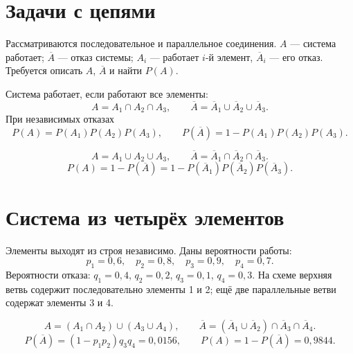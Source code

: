 \section*{Задачи с цепями}
Рассматриваются последовательное и параллельное соединения.
$A$ --- система работает; $\overline A$ --- отказ системы;
$A_i$ --- работает $i$-й элемент, $\overline A_i$ --- его отказ.
Требуется описать $A$, $\overline A$ и найти $P(A)$.

\begin{center}
\end{center}
Система работает, если работают все элементы:
\[
 A=A_1\cap A_2\cap A_3,\qquad
 \overline A=\overline A_1\cup\overline A_2\cup\overline A_3.
\]
При независимых отказах
\[
 P(A)=P(A_1)P(A_2)P(A_3),\qquad
 P(\overline A)=1-P(A_1)P(A_2)P(A_3).
\]
\begin{center}
\end{center}
\[
 A=A_1\cup A_2\cup A_3,\qquad
 \overline A=\overline A_1\cap\overline A_2\cap\overline A_3.
\]
\[
 P(A)=1-P(\overline A)=1-P(\overline A_1)P(\overline A_2)P(\overline A_3).
\]

\section*{Система из четырёх элементов}
Элементы выходят из строя независимо. Даны вероятности работы:
\[
 p_1=0{,}6,\quad p_2=0{,}8,\quad p_3=0{,}9,\quad p_4=0{,}7.
\]
Вероятности отказа: $q_1=0{,}4$, $q_2=0{,}2$, $q_3=0{,}1$, $q_4=0{,}3$.
На схеме верхняя ветвь содержит последовательно элементы 1 и 2;
ещё две параллельные ветви содержат элементы 3 и 4.
\begin{center}
\end{center}
\[
 A=(A_1\cap A_2)\cup(A_3\cup A_4),
 \qquad \overline A=(\overline A_1\cup\overline A_2)
 \cap\overline A_3\cap\overline A_4.
\]
\[
 P(\overline A)=(1-p_1p_2)q_3q_4=0{,}0156,
 \qquad P(A)=1-P(\overline A)=0{,}9844.
\]

